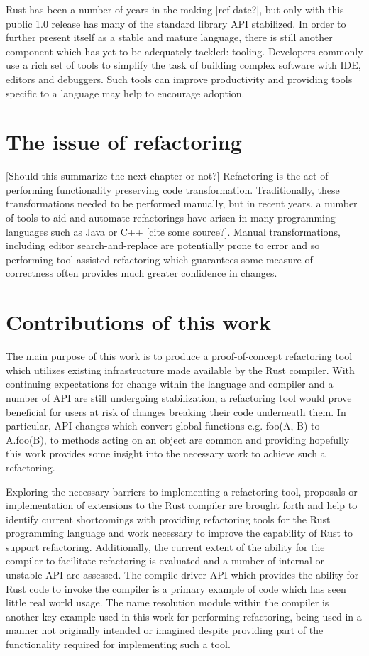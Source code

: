 Rust has been a number of years in the making [ref date?], but only with this public 1.0 release has many of the standard library API stabilized. In order to further present itself as a stable and mature language, there is still another component which has yet to be adequately tackled: tooling. Developers commonly use a rich set of tools to simplify the task of building complex software with IDE, editors and debuggers. Such tools can improve productivity and providing tools specific to a language may help to encourage adoption.

\section{The issue of refactoring}\label{S:refactorintro}
[Should this summarize the next chapter or not?] Refactoring is the act of performing functionality preserving code transformation. Traditionally, these transformations needed to be performed manually, but in recent years, a number of tools to aid and automate refactorings have arisen in many programming languages such as Java or C++ [cite some source?]. Manual transformations, including editor search-and-replace are potentially prone to error and so performing tool-assisted refactoring which guarantees some measure of correctness often provides much greater confidence in changes.

\section{Contributions of this work}\label{S:contrib}
The main purpose of this work is to produce a proof-of-concept refactoring tool which utilizes existing infrastructure made available by the Rust compiler. With continuing expectations for change within the language and compiler and a number of API are still undergoing stabilization, a refactoring tool would prove beneficial for users at risk of changes breaking their code underneath them. In particular, API changes which convert global functions e.g. foo(A, B) to A.foo(B), to methods acting on an object are common and providing hopefully this work provides some insight into the necessary work to achieve such a refactoring. 

Exploring the necessary barriers to implementing a refactoring tool, proposals or implementation of extensions to the Rust compiler are brought forth and help to identify current shortcomings with providing refactoring tools for the Rust programming language and work necessary to improve the capability of Rust to support refactoring. Additionally, the current extent of the ability for the compiler to facilitate refactoring is evaluated and a number of internal or unstable API are assessed. The compile driver API which provides the ability for Rust code to invoke the compiler is a primary example of code which has seen little real world usage. The name resolution module within the compiler is another key example used in this work for performing refactoring, being used in a manner not originally intended or imagined despite providing part of the functionality required for implementing such a tool.

